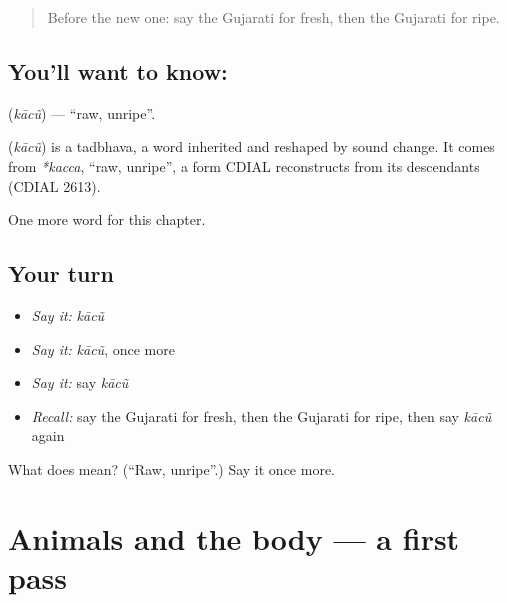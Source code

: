 \label{lesson:GU-C135-kacu}



\begin{quote}
Before the new one: say the Gujarati for fresh, then the Gujarati for ripe.
\end{quote}

\subsection*{You'll want to know: }
\textbf{} (\emph{kācũ}) — \textquotedblleft{}raw, unripe\textquotedblright{}.

\begin{cousinweb}
\textbf{} (\emph{kācũ}) is a tadbhava, a word inherited and reshaped by sound change. It comes from \emph{*kacca}, \textquotedblleft{}raw, unripe\textquotedblright{}, a form CDIAL reconstructs from its descendants (CDIAL 2613).
\end{cousinweb}

\begin{grammarlens}[title={What you've built}]
One more word for this chapter.
\end{grammarlens}

\subsection*{Your turn}
\begin{itemize}
\raggedright
  \item \emph{Say it:} \emph{kācũ}
  \item \emph{Say it:} \emph{kācũ}, once more
  \item \emph{Say it:} say \emph{kācũ}
  \item \emph{Recall:} say the Gujarati for fresh, then the Gujarati for ripe, then say \emph{kācũ} again
\end{itemize}

\begin{tcolorbox}[breakable,colback=teal!4,colframe=teal!35!black,title={Before you move on}]
What does  mean? (\textquotedblleft{}Raw, unripe\textquotedblright{}.) Say it once more.
\end{tcolorbox}
\section[(dialogue)]{Animals and the body — a first pass}

\label{lesson:GU-R135-first-pass-animals-and-the-body}




